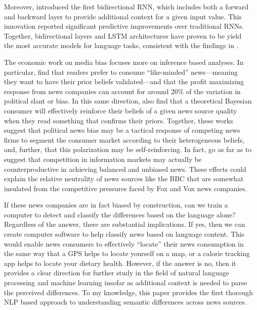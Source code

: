 \documentclass{article}
\begin{document}
		Moreover, \citet{schuster1997bidirectional} introduced the first bidirectional RNN, which includes both a forward and backward layer to provide additional context for a given input value. This innovation reported significant predictive improvements over traditional RNNs. Together, bidirectional layers and LSTM architectures have proven to be yield the most accurate models for language tasks, consistent with the findings in \citet{wang2015unified}. 
		
		The economic work on media bias focuses more on inference based analyses. In particular, \citet{gentzkow2010drives} find that readers prefer to consume ``like-minded'' news---meaning they want to have their prior beliefs validated---and that the profit maximizing response from news companies can account for around 20\% of the variation in political slant or bias. In this same direction, \citet{gentzkow2006media} also find that a theoretical Bayesian consumer will effectively reinforce their beliefs of a given news source quality when they read something that confirms their priors. Together, these works suggest that political news bias may be a tactical response of competing news firms to segment the consumer market according to their heterogeneous beliefs, and, further, that this polarization may be self-reinforcing. In fact, \citet{gentzkow2008competition} go as far as to suggest that competition in information markets may actually be counterproductive in achieving balanced and unbiased news. These effects could explain the relative neutrality of news sources like the BBC that are somewhat insulated from the competitive pressures faced by Fox and Vox news companies. 
		
		If these news companies are in fact biased by construction, can we train a computer to detect and classify the differences based on the language alone? Regardless of the answer, there are substantial implications. If yes, then we can create computer software to help classify news based on language content. This would enable news consumers to effectively ``locate'' their news consumption in the same way that a GPS helps to locate yourself on a map, or a calorie tracking app helps to locate your dietary health. However, if the answer is no, then it provides a clear direction for further study in the field of natural language processing and machine learning insofar as additional context is needed to parse the perceived differences. To my knowledge, this paper provides the first thorough NLP based approach to understanding semantic differences across news sources. 
		
\end{document}
